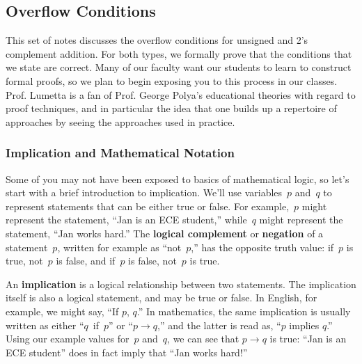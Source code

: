 \classtitle

\subsection{Overflow Conditions}

This set of notes discusses the overflow conditions for unsigned and
2's complement addition.  For both types, we formally prove that
the conditions that we state are correct.  Many of our faculty want our
students to learn to construct formal proofs, so we plan to begin
exposing you to this process in our classes.
%
Prof. Lumetta is a fan of Prof. George Polya's educational theories
with regard to proof techniques, and in particular the idea that one
builds up a repertoire of approaches by seeing the approaches used 
in practice.\\


\subsubsection{Implication and Mathematical Notation}

Some of you may not have been exposed to basics of mathematical logic, so
let's start with a brief introduction to implication.  We'll use 
variables~$p$ and~$q$ to represent statements that can be either true
or false.  For example,~$p$ might represent the statement, ``Jan is
an ECE student,'' while~$q$ might represent the statement, ``Jan
works hard.''  The {\bf logical complement} or {\bf negation} of 
a statement~$p$,
written for example as ``not~$p$,'' has the opposite truth value:
if~$p$ is true, not~$p$ is false, and if~$p$ is false, not~$p$ is
true.

An {\bf implication} is a logical relationship between two statements.
The implication itself is also a logical statement, and may be true or
false.  In English, for example, we might say, ``If $p$, $q$.''
In mathematics, the same implication is usually written as either 
``$q$~if~$p$'' or ``$p\rightarrow{q}$,'' and the latter is read 
as, ``$p$ implies $q$.''  
%
Using our example values for~$p$ and~$q$, we can see that
$p\rightarrow{q}$ is true: ``Jan is an ECE student'' does
in fact imply that ``Jan works hard!''

